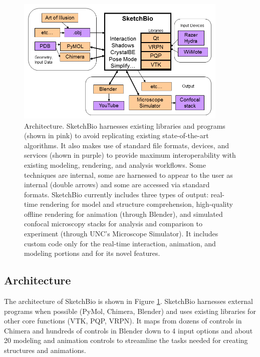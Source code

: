 \documentclass[twocolumn]{bmcart}%
\begin{document}
\begin{figure}[ht]
    \begin{center}
    \noindent\includegraphics[width=0.9\textwidth]
    {system_diagram.png}
    \end{center}
\caption{Architecture.
SketchBio harnesses existing libraries and programs (shown in pink) to avoid replicating existing state-of-the-art algorithms.
It also makes use of standard file formats, devices, and services (shown in purple) to provide maximum interoperability with existing modeling, rendering, and analysis workflows.
Some techniques are internal, some are harnessed to appear to the user as internal (double arrows) and some are accessed via standard formats.
SketchBio currently includes three types of output: real-time rendering for model and structure comprehension, high-quality offline rendering for animation (through Blender), and simulated confocal microscopy stacks for analysis and comparison to experiment (through UNC's Microscope Simulator).
It includes custom code only for the real-time interaction, animation, and modeling portions and for its novel features.}
\label{fig:architecture}
\end{figure}

\subsection*{Architecture}

The architecture of SketchBio is shown in Figure \ref{fig:architecture}.
SketchBio harnesses external programs when possible (PyMol, Chimera, Blender) and uses existing libraries for other core functions (VTK, PQP, VRPN).
It maps from dozens of controls in Chimera and hundreds of controls in Blender down to 4 input options and about 20 modeling and animation controls to streamline the tasks needed for creating structures and animations.
\end{document}
